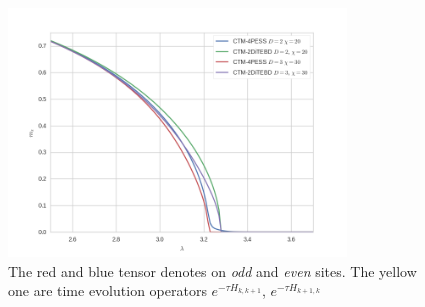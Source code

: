\begin{figure}[ht]
	\centering
	\includegraphics[width=0.80\textwidth]{figures/ctm_pess.png}
	\caption[The picture of the main idea of itebd.]{The red and blue tensor denotes on \textit{odd} and \textit{even} sites. The yellow one are time evolution operators $e^{-\tau H_{k,k+1}}$, $e^{-\tau H_{k+1,k}}$}
	\label{fig523}
\end{figure}


